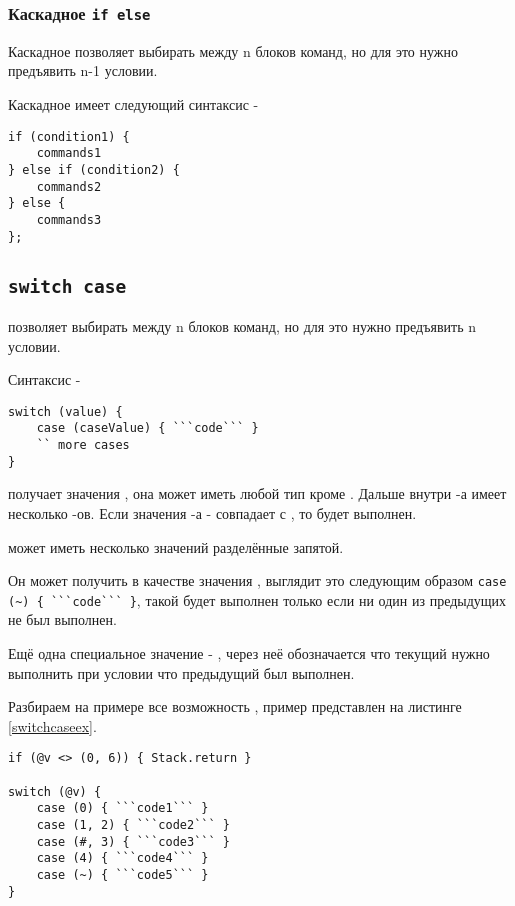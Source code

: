 \subsubsection{Каскадное \lstinline|if else|}

Каскадное  позволяет выбирать между n блоков команд, но для это нужно предъявить n-1 условии.

Каскадное  имеет следующий синтаксис -
\begin{lstlisting}[numbers=none]
if (condition1) {
	commands1
} else if (condition2) {
	commands2
} else {
	commands3
};
\end{lstlisting}

\subsection{\lstinline|switch case|}

 позволяет выбирать между n блоков команд, но для это нужно предъявить n условии.

Синтаксис -
\begin{lstlisting}[numbers=none]
switch (value) {
	case (caseValue) { ```code``` }
	`` more cases
}
\end{lstlisting}

 получает значения , она может иметь любой тип кроме \bool. Дальше внутри -а имеет несколько -ов. Если значения -а -  совпадает с , то  будет выполнен.

 может иметь несколько значений разделённые запятой.

Он может получить в качестве значения \void, выглядит это следующим образом \lstinline|case (~) { ```code``` }|, такой  будет выполнен только если ни один из предыдущих не был выполнен.

Ещё одна специальное значение - \code{#}, через неё обозначается что текущий  нужно выполнить при условии что предыдущий был выполнен.

Разбираем на примере все возможность , пример представлен на листинге \ref{switchcaseex}.

\begin{lstlisting}[caption=Использование switch case, label=switchcaseex]
if (@v <> (0, 6)) { Stack.return }

switch (@v) {
	case (0) { ```code1``` }
	case (1, 2) { ```code2``` }
	case (#, 3) { ```code3``` }
	case (4) { ```code4``` }
	case (~) { ```code5``` }
}
\end{lstlisting}

